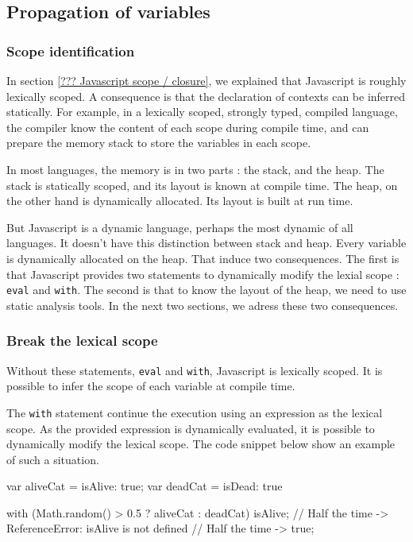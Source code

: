 \subsection{Propagation of variables}


\subsubsection{Scope identification}

In section \ref{??? Javascript scope / closure}, we explained that Javascript is roughly lexically scoped.
A consequence is that the declaration of contexts can be inferred statically.
For example, in a lexically scoped, strongly typed, compiled language, the compiler know the content of each scope during compile time, and can prepare the memory stack to store the variables in each scope.

In most languages, the memory is in two parts : the stack, and the heap.
The stack is statically scoped, and its layout is known at compile time.
The heap, on the other hand is dynamically allocated. Its layout is built at run time.

But Javascript is a dynamic language, perhaps the most dynamic of all languages.
It doesn't have this distinction between stack and heap. Every variable is dynamically allocated on the heap.
That induce two consequences.
The first is that Javascript provides two statements to dynamically modify the lexial scope : \texttt{eval} and \texttt{with}.
The second is that to know the layout of the heap, we need to use static analysis tools.
In the next two sections, we adress these two consequences.

\subsubsection{Break the lexical scope} \label{???:breakscope}

Without these statements, \texttt{eval} and \texttt{with}, Javascript is lexically scoped. It is possible to infer the scope of each variable at compile time.


The \texttt{with} statement continue the execution using an expression as the lexical scope.
As the provided expression is dynamically evaluated, it is possible to dynamically modify the lexical scope.
The code snippet below show an example of such a situation.

\begin{code}
var aliveCat = {isAlive: true};
var deadCat = {isDead: true}

with (Math.random() > 0.5 ? aliveCat : deadCat) {
  isAlive;
  // Half the time -> ReferenceError: isAlive is not defined
  // Half the time -> true;
}
\end{code}

